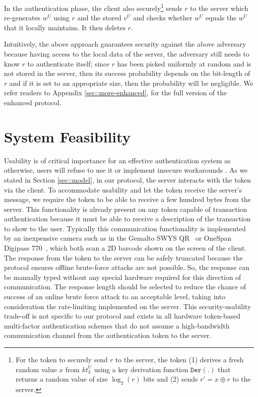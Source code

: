 \documentclass[runningheads]{llncs}
\newcommand{\sss}{\scriptscriptstyle}
\newcommand{\keyt}{\ensuremath{{kt}}}
\renewcommand{\verifier}{\ensuremath{{v}}}
\newcommand{\VC}[1]{\ensuremath{#1^{\sss U}}}
\begin{document}
In the authentication phase, the client also securely\footnote{For the token to securely send $r$ to the server, the token (1) derives a fresh random value $x$ from $\VC{\keyt_{\sss 3}}$ using a key derivation function $\mathtt{Der}(.)$ that returns a random value of size $\log_{\sss 2}(r)$ bits and  (2) sends $r'=x\oplus r$ to the server.} sends $r$ to the server which re-generates  $w^{\sss U}$ using $r$ and the stored \VC{\verifier} and checks whether $w^{\sss U}$ equals the $w^{\sss U}$ that it locally maintains. It then deletes $r$. 

Intuitively, the above approach guarantees security against the above adversary because having access to the local data of the server, the adversary still needs to know $r$ to authenticate itself; since $r$ has been picked uniformly at random and is not stored in the server, then its success probability depends on the bit-length of $r$ and if it is set to an appropriate size, then the probability will be negligible. 
%
We refer readers to  Appendix \ref{sec::more-enhanced}, for the full version of the enhanced protocol. 







\section{System Feasibility}
\label{sec:asymmetric}

Usability is of critical importance for an effective authentication system as otherwise, users will refuse to use it or implement insecure workarounds \cite{de2013comparative}.
As we stated in Section \ref{sec::model}, in our protocol, the server interacts with the token via the client. To accommodate usability and let the token receive the server's message, we require the token to be able to receive a few hundred bytes from the server. This functionality is already present on any token capable of transaction authentication because it must be able to receive a description of the transaction to show to the user. Typically this communication functionality is implemented by an inexpensive camera such as in the Gemalto SWYS QR~\cite{Gemalto} or OneSpan Digipass 770~\cite{Digipass-website}, which both scan a 2D barcode shown on the screen of the client. 
The response from the token to the server can be safely truncated because the protocol ensures offline brute-force attacks are not possible. So, the response can be manually typed without any special hardware required for this direction of communication. The response length should be selected to reduce the chance of success of an online brute force attack to an acceptable level, taking into consideration the rate-limiting implemented on the server. This security-usability trade-off is not specific to our protocol and exists in all hardware token-based multi-factor authentication schemes that do not assume a high-bandwidth communication channel from the authentication token to the server. 
\end{document}
